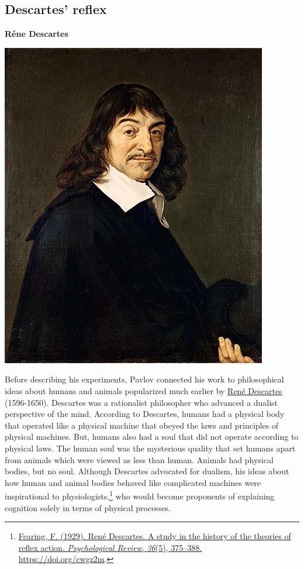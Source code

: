 \documentclass[
  oneside,
  12pt]{crumpbook}
\newenvironment{floatrightbox25}{%
  \wrapfigure{R}{.25\textwidth}%
  }{%
  \endwrapfigure}
\begin{document}
\hypertarget{descartes-reflex}{%
\subsection{Descartes' reflex}\label{descartes-reflex}}

\begin{floatrightbox25}
\textbf{Réne Descartes}

\includegraphics[width=1\linewidth]{imgs/Rene_Descartes}

\end{floatrightbox25}

Before describing his experiments, Pavlov connected his work to philosophical ideas about humans and animals popularized much earlier by \href{https://en.wikipedia.org/wiki/René_Descartes}{René Descartes} (1596-1650). Descartes was a rationalist philosopher who advanced a dualist perspective of the mind. According to Descartes, humans had a physical body that operated like a physical machine that obeyed the laws and principles of physical machines. But, humans also had a soul that did not operate according to physical laws. The human soul was the mysterious quality that set humans apart from animals which were viewed as less than human. Animals had physical bodies, but no soul. Although Descartes advocated for dualism, his ideas about how human and animal bodies behaved like complicated machines were inspirational to physiologists,\footnote{\protect\hyperlink{ref-fearingReneDescartesStudy1929}{Fearing, F. (1929). René {Descartes}. {A} study in the history of the theories of reflex action. \emph{Psychological Review}, \emph{36}(5), 375--388. \url{https://doi.org/cwgz2m}}.} who would become proponents of explaining cognition solely in terms of physical processes.
\end{document}
